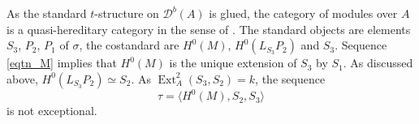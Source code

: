 \documentclass[12pt,a4paper]{amsart}
\newcommand{\dD}{{\mathcal{D}}}
\newcommand{\tr}{{\mbox{$t$-struc}\-tu\-r}}
\newcommand{\Ext}{\mathop{\operatorname{Ext}}\nolimits}
\theoremstyle{definition}
\begin{document}
%	
%	
%	
%	


As the standard \tr e on $\dD^b(A)$ is glued, the category of modules over $A$ is a quasi-hereditary category in the sense of \cite{Bez1}. The standard objects are elements $S_3$, $P_2$, $P_1$ of $\sigma$, the costandard are $H^0(M)$, $H^0(L_{S_3}P_2)$ and $S_3$. Sequence \eqref{eqtn_M} implies that  $H^0(M)$ is the unique extension of $S_3$ by $S_1$. As discussed above,  $H^0(L_{S_3}P_2) \simeq S_2$. As $\Ext_A^2(S_3,S_2) =k$, the sequence 
$$
\tau =\langle H^0(M), S_2,S_3 \rangle
$$ 
is not exceptional.
\end{document}
